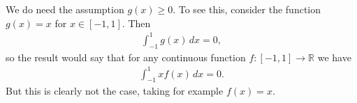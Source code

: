 \documentclass[letterpaper,10pt,english]{jupyterBook}
\begin{document}
\sphinxAtStartPar
We do need the assumption \(g(x)\geq 0\). To see this, consider the function \(g(x) = x\) for \(x\in [-1,1]\). Then
\begin{equation*}
\begin{split}
\int_{-1}^1 g(x)\, dx =0,
\end{split}
\end{equation*}
\sphinxAtStartPar
so the result would say that for any continuous function \(f\colon [-1,1]\rightarrow \mathbb{R}\) we have
\begin{equation*}
\begin{split}
\int_{-1}^1 xf(x)\, dx =0.
\end{split}
\end{equation*}
\sphinxAtStartPar
But this is clearly not the case, taking for example \(f(x)=x\).







\renewcommand{\indexname}{Index}
\printindex
\end{document}
